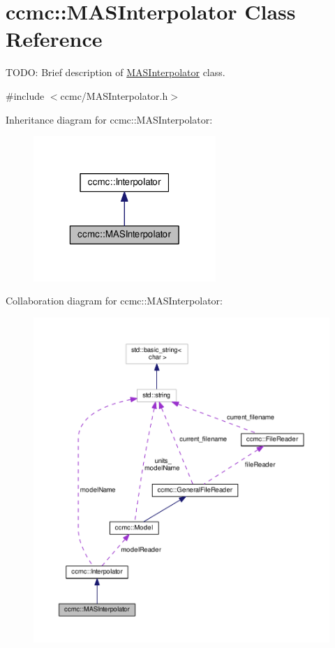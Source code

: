 \hypertarget{classccmc_1_1_m_a_s_interpolator}{\section{ccmc\-:\-:M\-A\-S\-Interpolator Class Reference}
\label{classccmc_1_1_m_a_s_interpolator}
}


T\-O\-D\-O\-: Brief description of \hyperlink{classccmc_1_1_m_a_s_interpolator}{M\-A\-S\-Interpolator} class.  




{\ttfamily \#include $<$ccmc/\-M\-A\-S\-Interpolator.\-h$>$}



Inheritance diagram for ccmc\-:\-:M\-A\-S\-Interpolator\-:
\nopagebreak
\begin{figure}[H]
\begin{center}
\leavevmode
\includegraphics[width=196pt]{classccmc_1_1_m_a_s_interpolator__inherit__graph}
\end{center}
\end{figure}


Collaboration diagram for ccmc\-:\-:M\-A\-S\-Interpolator\-:
\nopagebreak
\begin{figure}[H]
\begin{center}
\leavevmode
\includegraphics[width=350pt]{classccmc_1_1_m_a_s_interpolator__coll__graph}
\end{center}
\end{figure}
